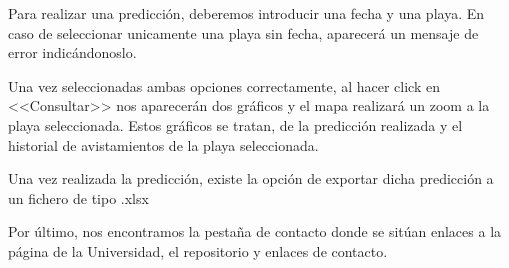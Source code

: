 Para realizar una predicción, deberemos introducir una fecha y una playa. En caso de seleccionar unicamente una playa sin fecha, aparecerá un mensaje de error indicándonoslo.

\label{pagina_error_fecha}

Una vez seleccionadas ambas opciones correctamente, al hacer click en <<Consultar>> nos aparecerán dos gráficos y el mapa realizará un zoom a la playa seleccionada. Estos gráficos se tratan, de la predicción realizada y el historial de avistamientos de la playa seleccionada. 

\label{pagina_consulta}

Una vez realizada la predicción, existe la opción de exportar dicha predicción a un fichero de tipo .xlsx

Por último, nos encontramos la pestaña de contacto donde se sitúan enlaces a la página de la Universidad, el repositorio y enlaces de contacto.

\label{pagina_contacto}